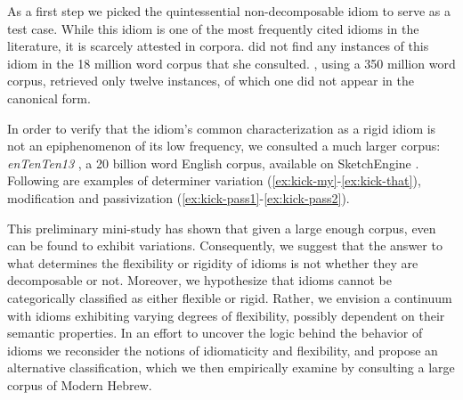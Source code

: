 \documentclass[output=paper]{langsci/langscibook}
\begin{document}
As a first step we picked the quintessential non-decomposable idiom  to serve as a test case. While this idiom is one of the most frequently cited idioms in the literature, it is scarcely attested in corpora. \citet{moon98} did not find any instances of this idiom in the 18 million word corpus that she consulted. \citet{riehemann01}, using a 350 million word corpus, retrieved only twelve instances, of which one did not appear in the canonical form.

In order to verify that the idiom's common characterization as a rigid idiom is not an epiphenomenon of its low frequency, we consulted a much larger corpus: \emph{enTenTen13} \citep{baroni-bernardini-ferraresi-zanchetta-2009}, a 20 billion word English corpus, available on SketchEngine \citep{sketchengine}. Following are examples of determiner variation (\ref{ex:kick-my}-\ref{ex:kick-that}), modification  and passivization (\ref{ex:kick-pass1}-\ref{ex:kick-pass2}).

\eal
\zl

This preliminary mini-study has shown that given a large enough corpus, even  can be found to exhibit variations. Consequently, we suggest that the answer to what determines the flexibility or rigidity of idioms is not whether they are decomposable or not. Moreover, we hypothesize that idioms cannot be categorically classified as either flexible or rigid. Rather, we envision a continuum with idioms exhibiting varying degrees of flexibility, possibly dependent on their semantic properties.
In an effort to uncover the logic behind the behavior of idioms we reconsider the notions of idiomaticity and flexibility, and propose an alternative classification, which we then empirically examine by consulting a large corpus of Modern Hebrew.
\end{document}
